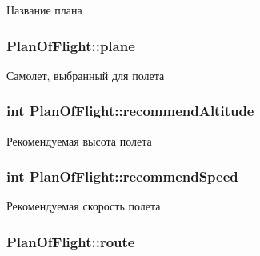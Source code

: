 Название плана 

\subsubsection[{\texorpdfstring{plane}{plane}}]{ Plan\+Of\+Flight\+::plane\hspace{0.3cm}{\ttfamily [private]}}\hypertarget{class_plan_of_flight_a2d25d26b62f203d093ed65284dc97b47}{}\label{class_plan_of_flight_a2d25d26b62f203d093ed65284dc97b47}


Самолет, выбранный для полета 

\subsubsection[{\texorpdfstring{recommend\+Altitude}{recommendAltitude}}]{\setlength{\rightskip}{0pt plus 5cm}int Plan\+Of\+Flight\+::recommend\+Altitude\hspace{0.3cm}{\ttfamily [private]}}\hypertarget{class_plan_of_flight_a139966275c45fc4f73bff2e9e9fe50cd}{}\label{class_plan_of_flight_a139966275c45fc4f73bff2e9e9fe50cd}


Рекомендуемая высота полета 

\subsubsection[{\texorpdfstring{recommend\+Speed}{recommendSpeed}}]{\setlength{\rightskip}{0pt plus 5cm}int Plan\+Of\+Flight\+::recommend\+Speed\hspace{0.3cm}{\ttfamily [private]}}\hypertarget{class_plan_of_flight_ae9373a9180eeb0d5b16f17708632de0c}{}\label{class_plan_of_flight_ae9373a9180eeb0d5b16f17708632de0c}


Рекомендуемая скорость полета 

\subsubsection[{\texorpdfstring{route}{route}}]{ Plan\+Of\+Flight\+::route\hspace{0.3cm}{\ttfamily [private]}}\hypertarget{class_plan_of_flight_a2408d478ac487707ca9872d34d91d546}{}\label{class_plan_of_flight_a2408d478ac487707ca9872d34d91d546}


